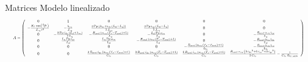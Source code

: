 \documentclass[a4paper, 10pt, journal]{ieeeconf}
\begin{document}
Matrices Modelo linealizado
\begin{equation*}\label{eq:matriz_A}
\resizebox{\textwidth}{!}{
$A = \left(\begin{array}{cccccc} 
0 & 1 & 0 & 0 & 0 & 0\\ 
-\frac{K_{l}\,\cos\left(\frac{\theta _{m}}{r}\right)}{J_{\mathrm{eq}}\,r^2} & -\frac{b_{\mathrm{eq}}}{J_{\mathrm{eq}}} & \frac{3\,\mathrm{Pp}\,\left(\lambda _{m}+i_{\mathrm{ds}}\,\left(L_{d}-L_{q}\right)\right)}{2\,J_{\mathrm{eq}}} & \frac{3\,\mathrm{Pp}\,i_{\mathrm{qs}}\,\left(L_{d}-L_{q}\right)}{2\,J_{\mathrm{eq}}} & 0 & 0\\ 
0 & -\frac{3\,\mathrm{Pp}\,i_{\mathrm{ds}}\,\left(L_{d}+\lambda _{m}\right)}{2\,L_{q}} & -\frac{R_{\mathrm{sref}}\,\left(\alpha _{\mathrm{cu}}\,\left(T_{s}-T_{\mathrm{sref}}\right)+1\right)}{L_{q}} & -\frac{L_{d}\,\mathrm{Pp}\,\omega _{m}}{L_{q}} & 0 & -\frac{R_{\mathrm{sref}}\,\alpha _{\mathrm{cu}}\,i_{\mathrm{qs}}}{L_{q}}\\ 
0 & \frac{L_{q}\,\mathrm{Pp}\,i_{\mathrm{qs}}}{L_{d}} & \frac{L_{q}\,\mathrm{Pp}\,\omega _{m}}{L_{d}} & -\frac{R_{\mathrm{sref}}\,\left(\alpha _{\mathrm{cu}}\,\left(T_{s}-T_{\mathrm{sref}}\right)+1\right)}{L_{d}} & 0 & -\frac{R_{\mathrm{sref}}\,\alpha _{\mathrm{cu}}\,i_{\mathrm{ds}}}{L_{d}}\\ 
0 & 0 & 0 & 0 & -\frac{R_{\mathrm{sref}}\,\left(\alpha _{\mathrm{cu}}\,\left(T_{s}-T_{\mathrm{sref}}\right)+1\right)}{L_{\mathrm{ls}}} & -\frac{R_{\mathrm{sref}}\,\alpha _{\mathrm{cu}}\,i_{\mathrm{os}}}{L_{\mathrm{ls}}}\\ 
0 & 0 & \frac{3\,R_{\mathrm{sref}}\,i_{\mathrm{qs}}\,\left(\alpha _{\mathrm{cu}}\,\left(T_{s}-T_{\mathrm{sref}}\right)+1\right)}{C_{\mathrm{ts}}} & \frac{3\,R_{\mathrm{sref}}\,i_{\mathrm{ds}}\,\left(\alpha _{\mathrm{cu}}\,\left(T_{s}-T_{\mathrm{sref}}\right)+1\right)}{C_{\mathrm{ts}}} & \frac{6\,R_{\mathrm{sref}}\,i_{\mathrm{os}}\,\left(\alpha _{\mathrm{cu}}\,\left(T_{s}-T_{\mathrm{sref}}\right)+1\right)}{C_{\mathrm{ts}}} & \frac{R_{\mathrm{sref}}\,\alpha _{\mathrm{cu}}\,\left(3\,{i_{\mathrm{ds}}}^2+6\,{i_{\mathrm{os}}}^2+3\,{i_{\mathrm{qs}}}^2\right)}{2\,C_{\mathrm{ts}}}-\frac{1}{C_{\mathrm{ts}}\,R_{\mathrm{ts},\mathrm{amb}}} 
\end{array}\right)$
}
\end{equation*}
\end{document}
